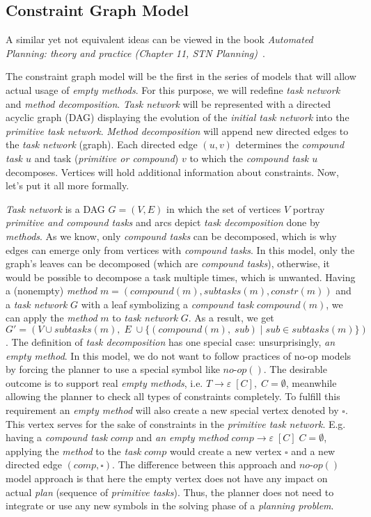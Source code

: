 \subsection{Constraint Graph Model}

\medskip\noindent
A similar yet not equivalent ideas can be viewed in the book \emph{Automated Planning: theory and practice (Chapter 11, STN Planning)}~\cite{nau}.

\medskip\noindent
The constraint graph model will be the first in the series of models that will allow actual usage of \emph{empty methods}. For this purpose, we will redefine \emph{task network} and \emph{method decomposition}. \emph{Task network} will be represented with a directed acyclic graph (DAG) displaying the evolution of the \emph{initial task network} into the \emph{primitive task network}. \emph{Method decomposition} will append new directed edges to the \emph{task network} (graph). Each directed edge $(u,v)$ determines the \emph{compound task $u$} and task (\emph{primitive or compound}) $v$ to which the \emph{compound task $u$} decomposes. Vertices will hold additional information about constraints. Now, let's put it all more formally.

\medskip\noindent
\emph{Task network} is a DAG $G = (V, E)$ in which the set of vertices $V$ portray \emph{primitive and compound tasks} and arcs depict \emph{task decomposition} done by \emph{methods}. As we know, only \emph{compound tasks} can be decomposed, which is why edges can emerge only from vertices with \emph{compound tasks}. In this model, only the graph's leaves can be decomposed (which are \emph{compound tasks}), otherwise, it would be possible to decompose a task multiple times, which is unwanted. Having a (nonempty) \emph{method} $m = (compound(m), subtasks(m), constr(m))$ and a \emph{task network} $G$ with a leaf symbolizing a \emph{compound task} $compound(m)$, we can apply the \emph{method} $m$ to \emph{task network} $G$. As a result, we get $G' = (V \cup subtasks(m), \; E \; \cup \{(compound(m), \;sub) \; | \; sub \in subtasks(m)\})$. The definition of \emph{task decomposition} has one special case: unsurprisingly, \emph{an empty method}. In this model, we do not want to follow practices of no-op models by forcing the planner to use a special symbol like $no\text{-}op()$. The desirable outcome is to support real \emph{empty methods}, i.e. $T \rightarrow \varepsilon \; [C], \; C = \emptyset$, meanwhile allowing the planner to check all types of constraints completely. To fulfill this requirement an \emph{empty method} will also create a new special vertex denoted by $\square$. This vertex serves for the sake of constraints in the \emph{primitive task network}. E.g. having a \emph{compound task} $comp$ and \emph{an empty method} $comp \rightarrow \varepsilon \; [C] \; C = \emptyset$, applying the \emph{method} to the \emph{task} $comp$ would create a new vertex $\square$ and a new directed edge $(comp, \square)$. The difference between this approach and $no\text{-}op()$ model approach is that here the empty vertex does not have any impact on actual \emph{plan} (sequence of \emph{primitive tasks}). Thus, the planner does not need to integrate or use any new symbols in the solving phase of a \emph{planning problem}. 

